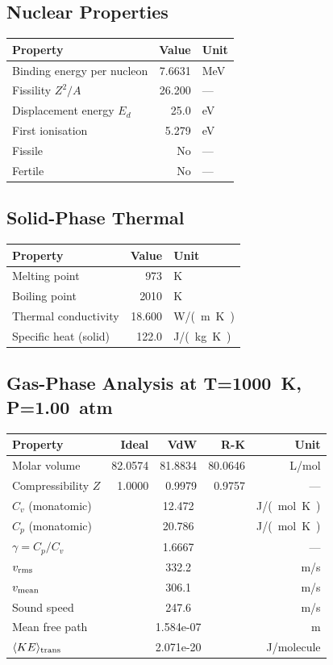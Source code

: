 \documentclass[11pt,a4paper]{article}
\begin{document}
\subsection{Nuclear Properties}
\begin{tabular}{lrl}
  \toprule
  Property & Value & Unit \\
  \midrule
  Binding energy per nucleon & 7.6631 & \si{MeV} \\
  Fissility $Z^2/A$ & 26.200 & --- \\
  Displacement energy $E_d$ & 25.0 & \si{eV} \\
  First ionisation & 5.279 & \si{eV} \\
  Fissile & No & --- \\
  Fertile & No & --- \\
  \bottomrule
\end{tabular}

\subsection{Solid-Phase Thermal}
\begin{tabular}{lrl}
  \toprule
  Property & Value & Unit \\
  \midrule
  Melting point & 973 & \si{K} \\
  Boiling point & 2010 & \si{K} \\
  Thermal conductivity & 18.600 & \si{W/(m.K)} \\
  Specific heat (solid) & 122.0 & \si{J/(kg.K)} \\
  \bottomrule
\end{tabular}

\subsection{Gas-Phase Analysis at T=\SI{1000}{K}, P=\SI{1.00}{atm}}
\begin{tabular}{lrrrr}
  \toprule
  Property & Ideal & VdW & R-K & Unit \\
  \midrule
  Molar volume & 82.0574 & 81.8834 & 80.0646 & \si{L/mol} \\
  Compressibility $Z$ & 1.0000 & 0.9979 & 0.9757 & --- \\
  \midrule
  $C_v$ (monatomic) & \multicolumn{3}{c}{12.472} & \si{J/(mol.K)} \\
  $C_p$ (monatomic) & \multicolumn{3}{c}{20.786} & \si{J/(mol.K)} \\
  $\gamma = C_p/C_v$ & \multicolumn{3}{c}{1.6667} & --- \\
  $v_{\rm rms}$ & \multicolumn{3}{c}{332.2} & \si{m/s} \\
  $v_{\rm mean}$ & \multicolumn{3}{c}{306.1} & \si{m/s} \\
  Sound speed & \multicolumn{3}{c}{247.6} & \si{m/s} \\
  Mean free path & \multicolumn{3}{c}{1.584e-07} & \si{m} \\
  $\langle KE \rangle_{\rm trans}$ & \multicolumn{3}{c}{2.071e-20} & \si{J/molecule} \\
  \bottomrule
\end{tabular}
\end{document}
